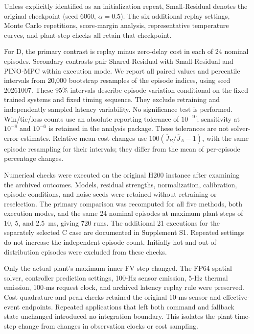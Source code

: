 Unless explicitly identified as an initialization repeat, Small-Residual denotes the original checkpoint (seed 6060, $\alpha=0.5$). The six additional replay settings, Monte Carlo repetitions, score-margin analysis, representative temperature curves, and plant-step checks all retain that checkpoint.

For D, the primary contrast is replay minus zero-delay cost in each of 24 nominal episodes. Secondary contrasts pair Shared-Residual with Small-Residual and PINO-MPC within execution mode. We report all paired values and percentile intervals from 20,000 bootstrap resamples of the episode indices, using seed 20261007. These 95\% intervals describe episode variation conditional on the fixed trained systems and fixed timing sequence. They exclude retraining and independently sampled latency variability. No significance test is performed. Win/tie/loss counts use an absolute reporting tolerance of $10^{-10}$; sensitivity at $10^{-8}$ and $10^{-6}$ is retained in the analysis package. These tolerances are not solver-error estimates. Relative mean-cost changes use $100(\overline J_B/\overline J_A-1)$, with the same episode resampling for their intervals; they differ from the mean of per-episode percentage changes.




\label{sec:numerical_protocol}

Numerical checks were executed on the original H200 instance after examining the archived outcomes. Models, residual strengths, normalization, calibration, episode conditions, and noise seeds were retained without retraining or reselection. The primary comparison was recomputed for all five methods, both execution modes, and the same 24 nominal episodes at maximum plant steps of 10, 5, and 2.5~ms, giving 720 runs. The additional 21 executions for the separately selected C case are documented in Supplement S1. Repeated settings do not increase the independent episode count. Initially hot and out-of-distribution episodes were excluded from these checks.

Only the actual plant's maximum inner FV step changed. The FP64 spatial solver, controller prediction settings, 100-Hz sensor emission, 5-Hz thermal emission, 100-ms request clock, and archived latency replay rule were preserved. Cost quadrature and peak checks retained the original 10-ms sensor and effective-event endpoints. Repeated applications that left both command and fallback state unchanged introduced no integration boundary. This isolates the plant time-step change from changes in observation clocks or cost sampling.

